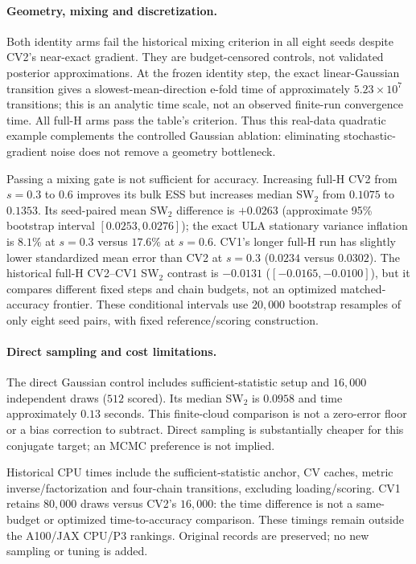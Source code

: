 \paragraph{Geometry, mixing and discretization.}
Both identity arms fail the historical mixing criterion in all eight seeds despite CV2's near-exact gradient. They are budget-censored controls, not validated posterior approximations. At the frozen identity step, the exact linear-Gaussian transition gives a slowest-mean-direction e-fold time of approximately $5.23\times10^7$ transitions; this is an analytic time scale, not an observed finite-run convergence time. All full-H arms pass the table's criterion. Thus this real-data quadratic example complements the controlled Gaussian ablation: eliminating stochastic-gradient noise does not remove a geometry bottleneck.

Passing a mixing gate is not sufficient for accuracy. Increasing full-H CV2 from $s=0.3$ to $0.6$ improves its bulk ESS but increases median SW$_2$ from $0.1075$ to $0.1353$. Its seed-paired mean SW$_2$ difference is $+0.0263$ (approximate 95\% bootstrap interval $[0.0253,0.0276]$); the exact ULA stationary variance inflation is $8.1\%$ at $s=0.3$ versus $17.6\%$ at $s=0.6$. CV1's longer full-H run has slightly lower standardized mean error than CV2 at $s=0.3$ ($0.0234$ versus $0.0302$). The historical full-H CV2--CV1 SW$_2$ contrast is $-0.0131$ ($[-0.0165,-0.0100]$), but it compares different fixed steps and chain budgets, not an optimized matched-accuracy frontier. These conditional intervals use $20{,}000$ bootstrap resamples of only eight seed pairs, with fixed reference/scoring construction.

\paragraph{Direct sampling and cost limitations.}
The direct Gaussian control includes sufficient-statistic setup and $16{,}000$ independent draws ($512$ scored). Its median SW$_2$ is $0.0958$ and time approximately $0.13$ seconds. This finite-cloud comparison is not a zero-error floor or a bias correction to subtract. Direct sampling is substantially cheaper for this conjugate target; an MCMC preference is not implied.

Historical CPU times include the sufficient-statistic anchor, CV caches, metric inverse/factorization and four-chain transitions, excluding loading/scoring. CV1 retains $80{,}000$ draws versus CV2's $16{,}000$: the time difference is not a same-budget or optimized time-to-accuracy comparison. These timings remain outside the A100/JAX CPU/P3 rankings. Original records are preserved; no new sampling or tuning is added.

